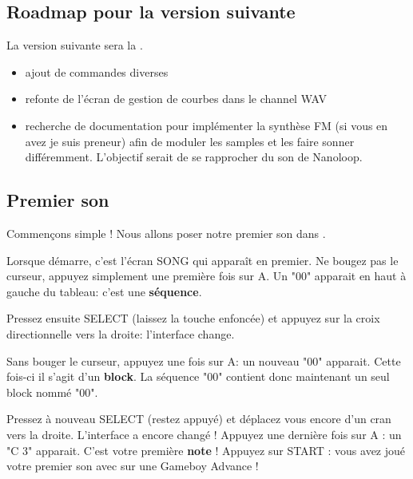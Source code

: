 \subsection{Roadmap pour la version suivante}

La version suivante sera la \fatnextversion. \medskip
\begin{itemize}
  \item{ajout de commandes diverses}
  \item{refonte de l'écran de gestion de courbes dans le channel WAV}
  \item{recherche de documentation pour implémenter la synthèse FM (si vous en avez je suis preneur) afin de moduler les samples et les faire sonner différemment.
              L'objectif serait de se rapprocher du son de Nanoloop.}
\end{itemize}

\subsection{Premier son}

Commençons simple ! Nous allons poser notre premier son dans \FAT.\medskip

Lorsque \FAT démarre, c'est l'écran SONG qui apparaît en premier.
Ne bougez pas le curseur, appuyez simplement une première fois sur A.
Un "00" apparait en haut à gauche du tableau: c'est une {\bf séquence}.


Pressez ensuite SELECT (laissez la touche enfoncée) et appuyez sur la croix directionnelle vers la droite: l'interface change.


Sans bouger le curseur, appuyez une fois sur A: un nouveau "00" apparait.
Cette fois-ci il s'agit d'un {\bf block}. La séquence "00" contient donc maintenant un seul block nommé "00".


Pressez à nouveau SELECT (restez appuyé) et déplacez vous encore d'un cran vers la droite.
L'interface a encore changé !
Appuyez une dernière fois sur A : un "C 3" apparait.
C'est votre première {\bf note} !
Appuyez sur START : vous avez joué votre premier son avec \FAT sur une Gameboy Advance !


